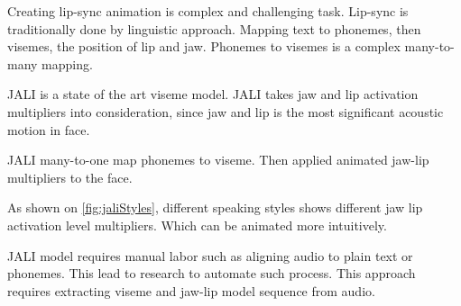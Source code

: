 \documentclass[10pt,twocolumn,letterpaper]{article}
\begin{document}
Creating lip-sync animation is complex and challenging task. Lip-sync is traditionally done by linguistic approach. Mapping text to phonemes, then visemes, the position of lip and jaw\cite{ezzatMikeTalkTalkingFacial1998}. Phonemes to visemes is a complex many-to-many mapping.

JALI\cite{edwardsJALIAnimatorcentricViseme2016} is a state of the art viseme model. JALI takes jaw and lip activation multipliers into consideration, since jaw and lip is the most significant acoustic motion in face.

JALI many-to-one map phonemes to viseme. Then applied animated jaw-lip multipliers to the face.

As shown on \cref{fig:jaliStyles}, different speaking styles shows different jaw lip activation level multipliers. Which can be animated more intuitively.

JALI model requires manual labor such as aligning audio to plain text or phonemes. This lead to research to automate such process. This approach requires extracting viseme and jaw-lip model sequence from audio. 








{\small



}
\end{document}
